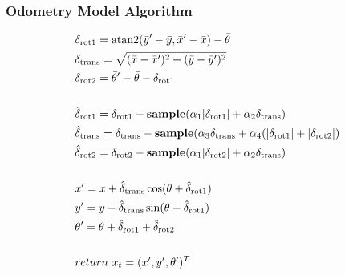\documentclass[14pt]{beamer}
\begin{document}
\begingroup
\footnotesize
\begin{frame}
\frametitle{Odometry Model Algorithm}
\begin{align}
&\delta_{\text{rot1}} = \text{atan2}(\bar{y}' - \bar{y}, \bar{x}' - \bar{x}) - \bar{\theta}\\ 
&\delta_{\text{trans}} = \sqrt{(\bar{x} - \bar{x}')^2 + (\bar{y} - \bar{y}')^2}\\
&\delta_{\text{rot2}} = \bar{\theta}' - \bar{\theta} - \delta_{\text{rot1}}\\
\notag \\
&\hat{\delta}_{\text{rot1}} = \delta_{\text{rot1}} - \textbf{sample}(\alpha_1\lvert\delta_{\text{rot1}}\rvert + \alpha_2\delta_{\text{trans}})\\
&\hat{\delta}_{\text{trans}} = \delta_{\text{trans}} - \textbf{sample}(\alpha_3\delta_{\text{trans}} + \alpha_4(\lvert\delta_{\text{rot1}}\rvert + \lvert\delta_{\text{rot2}}\rvert)\\
&\hat{\delta}_{\text{rot2}} = \delta_{\text{rot2}} - \textbf{sample}(\alpha_1\lvert\delta_{\text{rot2}}\rvert + \alpha_2\delta_{\text{trans}})\\
\notag \\
&x' = x + \hat{\delta}_{\text{trans}}\cos(\theta + \hat{\delta}_{\text{rot1}})\\
&y' = y + \hat{\delta}_{\text{trans}}\sin(\theta + \hat{\delta}_{\text{rot1}})\\
&\theta' = \theta + \hat{\delta}_{\text{rot1}} + \hat{\delta}_{\text{rot2}}\\
\notag \\
&return \ x_t = (x', y', \theta')^T
\end{align}
\end{frame}
\endgroup
\end{document}
